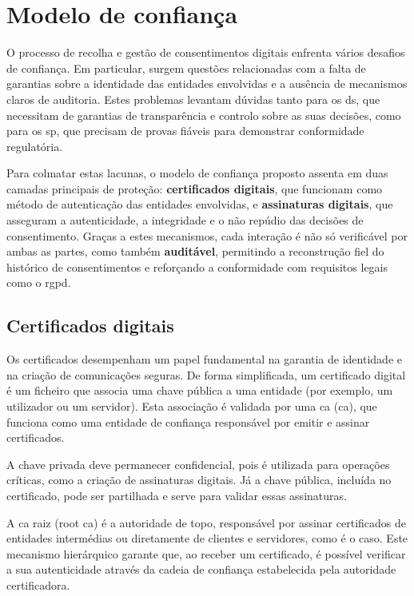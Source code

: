 
\section{Modelo de confiança}

O processo de recolha e gestão de consentimentos digitais enfrenta vários desafios de confiança.
Em particular, surgem questões relacionadas com a falta de garantias sobre a identidade das entidades envolvidas e a ausência de mecanismos claros de auditoria. 
Estes problemas levantam dúvidas tanto para os \acrshort{ds}, que necessitam de garantias de transparência e controlo sobre as suas decisões, como para os \acrshort{sp}, que precisam de provas fiáveis para demonstrar conformidade regulatória.

Para colmatar estas lacunas, o modelo de confiança proposto assenta em duas camadas principais de proteção: 
\textbf{certificados digitais}, que funcionam como método de autenticação das entidades envolvidas, e \textbf{assinaturas digitais}, que asseguram a autenticidade, a integridade e o não repúdio das decisões de consentimento. 
Graças a estes mecanismos, cada interação é não só verificável por ambas as partes, como também \textbf{auditável}, permitindo a reconstrução fiel do histórico de consentimentos e reforçando a conformidade com requisitos legais como o \acrshort{rgpd}.

\subsection{Certificados digitais}

Os certificados desempenham um papel fundamental na garantia de identidade e na criação de comunicações seguras. De forma simplificada, um certificado digital é um ficheiro que associa uma chave pública a uma entidade (por exemplo, um utilizador ou um servidor). Esta associação é validada por uma \acrlong{ca} (\acrshort{ca}), que funciona como uma entidade de confiança responsável por emitir e assinar certificados.

A chave privada deve permanecer confidencial, pois é utilizada para operações críticas, como a criação de assinaturas digitais. Já a chave pública, incluída no certificado, pode ser partilhada e serve para validar essas assinaturas.

A \acrshort{ca} raiz (root \acrshort{ca}) é a autoridade de topo, responsável por assinar certificados de entidades intermédias ou diretamente de clientes e servidores, como é o caso. Este mecanismo hierárquico garante que, ao receber um certificado, é possível verificar a sua autenticidade através da cadeia de confiança estabelecida pela autoridade certificadora.

